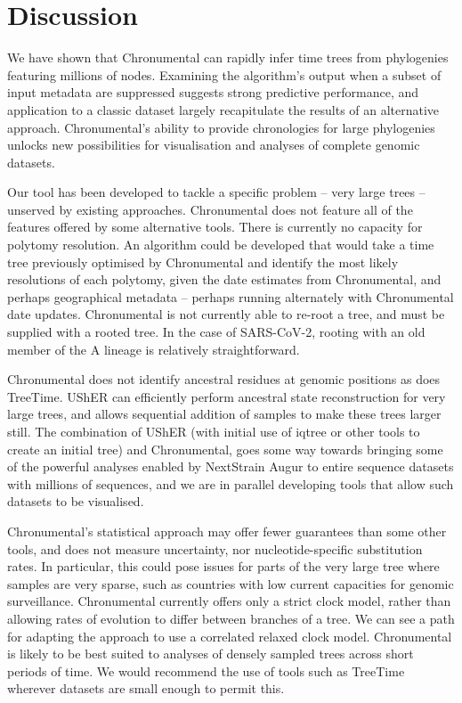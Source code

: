 \section*{Discussion}

We have shown that Chronumental can rapidly infer time trees from phylogenies featuring millions of nodes. Examining the algorithm's output when a subset of input metadata are suppressed suggests strong predictive performance, and application to a classic dataset largely recapitulate the results of an alternative approach. Chronumental's ability to provide chronologies for large phylogenies unlocks new possibilities for visualisation and analyses of complete genomic datasets.

Our tool has been developed to tackle a specific problem -- very large trees -- unserved by existing approaches. Chronumental does not feature all of the features offered by some alternative tools. There is currently no capacity for polytomy resolution. An algorithm could be developed that would take a time tree previously optimised by Chronumental and identify the most likely resolutions of each polytomy, given the date estimates from Chronumental, and perhaps geographical metadata -- perhaps running alternately with Chronumental date updates.  Chronumental is not currently able to re-root a tree, and must be supplied with a rooted tree. In the case of SARS-CoV-2, rooting with an old member of the A lineage is relatively straightforward.

Chronumental does not identify ancestral residues at genomic positions as does TreeTime. UShER \citep{Turakhia2021-la} can efficiently perform ancestral state reconstruction for very large trees, and allows sequential addition of samples to make these trees larger still. The combination of UShER (with initial use of iqtree \citep{Minh2020-vc} or other tools to create an initial tree) and Chronumental, goes some way towards bringing some of the powerful analyses enabled by NextStrain Augur \citep{Hadfield2018-fb} to entire sequence datasets with millions of sequences, and we are in parallel developing tools \citep{taxonium} that allow such datasets to be visualised.

Chronumental's statistical approach may offer fewer guarantees than some other tools, and does not measure uncertainty, nor nucleotide-specific substitution rates. In particular, this could pose issues for parts of the very large tree where samples are very sparse, such as countries with low current capacities for genomic surveillance. Chronumental currently offers only a strict clock model, rather than allowing rates of evolution to differ between branches of a tree. We can see a path for adapting the approach to use a correlated relaxed clock model. Chronumental is likely to be best suited to analyses of densely sampled trees across short periods of time. We would recommend the use of tools such as TreeTime wherever datasets are small enough to permit this.

